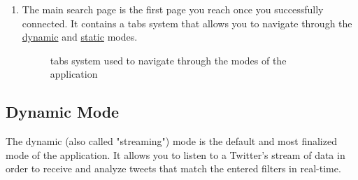 \documentclass[a4paper,11pt]{report}
\begin{document}
\begin{enumerate}
	\item The main search page is the first page you reach once you successfully connected. It contains a tabs system that allows you to navigate through the \underline{dynamic} and \underline{static} modes.
	\begin{figure}[H]
	\vspace{-5pt}
	\begin{center}
	\vspace{-5pt}
	\caption{tabs system used to navigate through the modes of the application}
	\end{center}
	\end{figure}
	\vspace{-10pt}
\end{enumerate}
\newpage

\subsection{Dynamic Mode}
The dynamic (also called "streaming") mode is the default and most finalized mode of the application. It allows you to listen to a Twitter's stream of data in order to receive and analyze tweets that match the entered filters in real-time.
\end{document}
